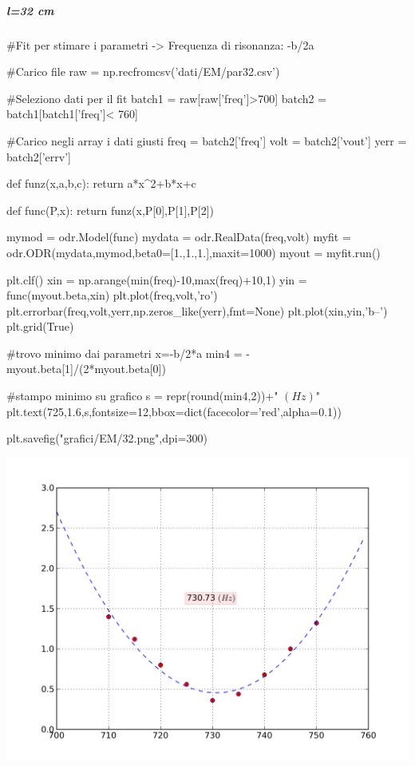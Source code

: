 \subparagraph*{l=32 cm}

\begin{sagesilent}
 #Fit per stimare i parametri -> Frequenza di risonanza: -b/2a

#Carico file
raw = np.recfromcsv('dati/EM/par32.csv')

#Seleziono dati per il fit
batch1 = raw[raw['freq']>700]
batch2 = batch1[batch1['freq']< 760]

#Carico negli array i dati giusti
freq = batch2['freq']
volt = batch2['vout']
yerr = batch2['errv']


def funz(x,a,b,c):
    return a*x^2+b*x+c

def func(P,x):
    return funz(x,P[0],P[1],P[2])

mymod = odr.Model(func)
mydata = odr.RealData(freq,volt)
myfit = odr.ODR(mydata,mymod,beta0=[1.,1.,1.],maxit=1000)
myout = myfit.run()

plt.clf()
xin = np.arange(min(freq)-10,max(freq)+10,1)
yin = func(myout.beta,xin)
plt.plot(freq,volt,'ro')
plt.errorbar(freq,volt,yerr,np.zeros_like(yerr),fmt=None)
plt.plot(xin,yin,'b--')
plt.grid(True)

#trovo minimo dai parametri x=-b/2*a
min4 = -myout.beta[1]/(2*myout.beta[0]) 

#stampo minimo su grafico
s = repr(round(min4,2))+" $(Hz)$"
plt.text(725,1.6,s,fontsize=12,bbox=dict(facecolor='red',alpha=0.1))

plt.savefig("grafici/EM/32.png",dpi=300)
\end{sagesilent}

\includegraphics[scale=0.75]{grafici/EM/32.png}

